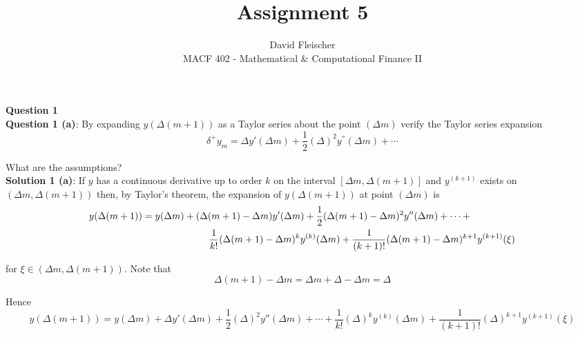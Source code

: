 \documentclass[12pt]{article}
\begin{document}
 
 
\title{Assignment 5}
\author{David Fleischer\\ 
MACF 402 - Mathematical \& Computational Finance II}
 
\maketitle


{\bf\large Question 1} \\


{\bf Question 1 (a)}: By expanding $y \left(\Delta(m + 1) \right)$ as a Taylor series about the point $(\Delta m)$ verify the Taylor series expansion 
\begin{equation*}
	\delta^+y_m = \Delta y'(\Delta m) + \frac{1}{2}(\Delta)^2 y^{''} (\Delta m) + \cdots
\end{equation*}

What are the assumptions? \\

{\bf Solution 1 (a)}: If $y$ has a continuous derivative up to order $k$ on the interval $[\Delta m, \Delta(m + 1)]$ and $y^{(k + 1)}$ exists on $(\Delta m, \Delta(m + 1))$ then, by Taylor's theorem, the expansion of $y(\Delta(m + 1))$ at point $(\Delta m)$ is
\begin{align*}
	y(\Delta(m + 1)) &= y(\Delta m) + (\Delta(m + 1) - \Delta m)y'(\Delta m) + \frac{1}{2}(\Delta(m + 1) - \Delta m)^2y''(\Delta m) + \cdots + \\
	&\hphantom{{}={------}} \frac{1}{k!}(\Delta(m + 1) - \Delta m)^ky^{(k)}(\Delta m) + \frac{1}{(k + 1)!}(\Delta(m + 1) - \Delta m)^{k + 1}y^{(k + 1)}(\xi)
\end{align*}

for $\xi \in (\Delta m, \Delta(m + 1))$. Note that
\begin{equation*}
	\Delta(m + 1) - \Delta m = \Delta m + \Delta - \Delta m = \Delta
\end{equation*}

Hence
\begin{equation*}
	y(\Delta(m + 1)) = y(\Delta m) + \Delta y'(\Delta m) + \frac{1}{2}(\Delta)^2y''(\Delta m) + \cdots + \frac{1}{k!}(\Delta)^ky^{(k)}(\Delta m)  + \frac{1}{(k + 1)!}(\Delta)^{k + 1}y^{(k + 1)}(\xi)
\end{equation*}
\end{document}
